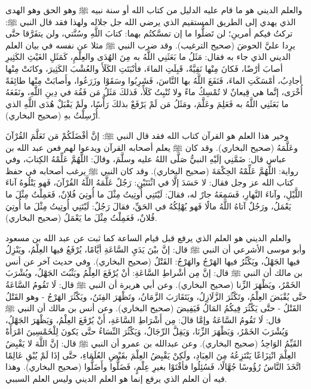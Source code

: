 والعلم الديني هو ما قام عليه الدليل من كتاب الله أو سنة نبيه ﷺ وهو الحق وهو الهدى الذي يهدي إلى الطريق المستقيم الذي يرضي الله جل جلاله ولهذا فقد قال النبي ﷺ: تركتُ فيكم أمرينِ؛ لن تَضلُّوا ما إن تمسَّكتُم بهما: كتابَ اللَّهِ وسُنَّتي، ولن يتفَرَّقا حتَّى يرِدا عليَّ الحوضَ {\footnotesize (صحيح الترغيب)}. وقد ضرب النبي ﷺ مثلا عن نفسه في بيان العلم الديني الذي جاء به فقال: مَثَلُ ما بَعَثَنِي اللَّهُ به مِنَ الهُدَى والعِلْمِ، كَمَثَلِ الغَيْثِ الكَثِيرِ أصابَ أرْضًا، فَكانَ مِنْها نَقِيَّةٌ، قَبِلَتِ الماءَ، فأنْبَتَتِ الكَلَأَ والعُشْبَ الكَثِيرَ، وكانَتْ مِنْها أجادِبُ، أمْسَكَتِ الماءَ، فَنَفَعَ اللَّهُ بها النَّاسَ، فَشَرِبُوا وسَقَوْا وزَرَعُوا، وأَصابَتْ مِنْها طائِفَةً أُخْرَى، إنَّما هي قِيعانٌ لا تُمْسِكُ ماءً ولا تُنْبِتُ كَلَأً، فَذلكَ مَثَلُ مَن فَقُهَ في دِينِ اللَّهِ، ونَفَعَهُ ما بَعَثَنِي اللَّهُ به فَعَلِمَ وعَلَّمَ، ومَثَلُ مَن لَمْ يَرْفَعْ بذلكَ رَأْسًا، ولَمْ يَقْبَلْ هُدَى اللَّهِ الذي أُرْسِلْتُ بهِ {\footnotesize (صحيح البخاري)}.

 وخير هذا العلم هو القرآن كتاب الله فقد قال النبي ﷺ: إنَّ أفْضَلَكُمْ مَن تَعَلَّمَ القُرْآنَ وعَلَّمَهُ {\footnotesize (صحيح البخاري)}. وقد كان ﷺ يعلم أصحابه القرآن ويدعوا لهم فعن عبد الله بن عباس قال: ضَمَّنِي إلَيْهِ النبيُّ صَلَّى اللهُ عليه وسلَّمَ، وقالَ: اللَّهُمَّ عَلِّمْهُ الكِتابَ، وفي رواية: اللَّهُمَّ عَلِّمْهُ الحِكْمَةَ {\footnotesize (صحيح البخاري)}. وقد كان النبي ﷺ يرغب أصحابه في حفظ كتاب الله عز وجل فقال: لا حَسَدَ إلَّا في اثْنَتَيْنِ: رَجُلٌ عَلَّمَهُ اللَّهُ القُرْآنَ، فَهو يَتْلُوهُ آناءَ اللَّيْلِ، وآناءَ النَّهارِ، فَسَمِعَهُ جارٌ له، فقالَ: لَيْتَنِي أُوتِيتُ مِثْلَ ما أُوتِيَ فُلانٌ، فَعَمِلْتُ مِثْلَ ما يَعْمَلُ، ورَجُلٌ آتاهُ اللَّهُ مالًا فَهو يُهْلِكُهُ في الحَقِّ، فقالَ رَجُلٌ: لَيْتَنِي أُوتِيتُ مِثْلَ ما أُوتِيَ فُلانٌ، فَعَمِلْتُ مِثْلَ ما يَعْمَلُ {\footnotesize (صحيح البخاري)}.

والعلم الديني هو العلم الذي يرفع قبل قيام الساعة كما ثبت عن عبد الله بن مسعود وأبو موسى الأشرعي أن النبي ﷺ قال: 
إنَّ بيْنَ يَدَيِ السَّاعَةِ أيَّامًا، يُرْفَعُ فيها العِلْمُ، ويَنْزِلُ فيها الجَهْلُ، ويَكْثُرُ فيها الهَرْجُ والهَرْجُ: القَتْلُ {\footnotesize (صحيح البخاري)}. وفي حديث آخر عن أنس بن مالك أن النبي ﷺ قال: إنَّ مِن أشْراطِ السَّاعَةِ: أنْ يُرْفَعَ العِلْمُ ويَثْبُتَ الجَهْلُ، ويُشْرَبَ الخَمْرُ، ويَظْهَرَ الزِّنا {\footnotesize (صحيح البخاري)}. وعن أبي هريرة أن النبي ﷺ قال: لَا تَقُومُ السَّاعَةُ حتَّى يُقْبَضَ العِلْمُ، وتَكْثُرَ الزَّلَازِلُ، ويَتَقَارَبَ الزَّمَانُ، وتَظْهَرَ الفِتَنُ، ويَكْثُرَ الهَرْجُ - وهو القَتْلُ القَتْلُ - حتَّى يَكْثُرَ فِيكُمُ المَالُ فَيَفِيضَ {\footnotesize (صحيح البخاري)}. وعن أنس بن مالك أن النبي ﷺ قال: 
لَا تَقُومُ السَّاعَةُ وإمَّا قالَ: مِن أَشْرَاطِ السَّاعَةِ، أَنْ يُرْفَعَ العِلْمُ، وَيَظْهَرَ الجَهْلُ، وَيُشْرَبَ الخَمْرُ، وَيَظْهَرَ الزِّنَا، وَيَقِلَّ الرِّجَالُ، وَيَكْثُرَ النِّسَاءُ حتَّى يَكونَ لِلْخَمْسِينَ امْرَأَةً القَيِّمُ الوَاحِدُ {\footnotesize (صحيح البخاري)}. وعن عبدالله بن عمرو أن النبي ﷺ قال: إنَّ اللَّهَ لا يَقْبِضُ العِلْمَ انْتِزَاعًا يَنْتَزِعُهُ مِنَ العِبَادِ، ولَكِنْ يَقْبِضُ العِلْمَ بقَبْضِ العُلَمَاءِ، حتَّى إذَا لَمْ يُبْقِ عَالِمًا اتَّخَذَ النَّاسُ رُؤُوسًا جُهَّالًا، فَسُئِلُوا فأفْتَوْا بغيرِ عِلْمٍ، فَضَلُّوا وأَضَلُّوا {\footnotesize (صحيح البخاري)}. وهذا فيه أن العلم الذي يرفع إنما هو العلم الديني وليس العلم السببي.

